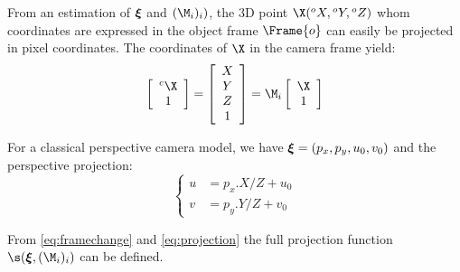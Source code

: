 \documentclass{ecnreport}
\begin{document}
From an estimation of ${\boldsymbol{\xi}}$ and $(\M_i)_i)$, the 3D point $\X({}^o X,{}^o Y,{}^o Z)$ whom coordinates are expressed in the object frame $\Frame{o}$ can easily be projected in pixel coordinates.
The coordinates of $\X$ in the camera frame yield:
\begin{equation}\label{eq:framechange}
 \left[\begin{array}{c}{}^c\X\\1\end{array}\right]=   \left[\begin{array}{c}X\\Y\\Z\\1\end{array}\right] =\M_i\left[\begin{array}{c}\X\\1\end{array}\right]
\end{equation}

For a classical perspective camera model, we have ${\boldsymbol{\xi}} = (p_x, p_y, u_0, v_0)$ and the perspective projection:
\begin{equation}\label{eq:projection}
 \left\{\begin{array}{ll}
  u &= p_x.X/Z + u_0 \\
  v &= p_y.Y/Z + v_0
 \end{array}\right.
\end{equation}

From \eqref{eq:framechange} and \eqref{eq:projection} the full projection function $\s(\xii, (\M_i)_i)$ can be defined.\\ 
\end{document}
